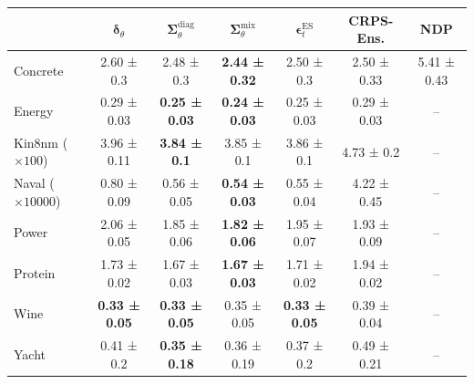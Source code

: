 \begin{tabular}{l|c|c|c|c|c|c}
\toprule
 & $\bm\delta_\theta$ & $\bm\Sigma_\theta^{\mathrm{diag}}$ & $\bm\Sigma_\theta^{\mathrm{mix}}$ & $\bm\epsilon_t^\mathrm{ES}$ & CRPS-Ens. & NDP \\
\midrule
Concrete & 2.60 ± 0.3 & 2.48 ± 0.3 & \textbf{2.44 ± 0.32} & 2.50 ± 0.3 & 2.50 ± 0.33 & 5.41 ± 0.43 \\
Energy & 0.29 ± 0.03 & \textbf{0.25 ± 0.03} & \textbf{0.24 ± 0.03} & 0.25 ± 0.03 & 0.29 ± 0.03 & -- \\
Kin8nm ($\times 100$) & 3.96 ± 0.11 & \textbf{3.84 ± 0.1} & 3.85 ± 0.1 & 3.86 ± 0.1 & 4.73 ± 0.2 & -- \\
Naval ($\times 10000$) & 0.80 ± 0.09 & 0.56 ± 0.05 & \textbf{0.54 ± 0.03} & 0.55 ± 0.04 & 4.22 ± 0.45 & -- \\
Power & 2.06 ± 0.05 & 1.85 ± 0.06 & \textbf{1.82 ± 0.06} & 1.95 ± 0.07 & 1.93 ± 0.09 & -- \\
Protein & 1.73 ± 0.02 & 1.67 ± 0.03 & \textbf{1.67 ± 0.03} & 1.71 ± 0.02 & 1.94 ± 0.02 & -- \\
Wine & \textbf{0.33 ± 0.05} & \textbf{0.33 ± 0.05} & 0.35 ± 0.05 & \textbf{0.33 ± 0.05} & 0.39 ± 0.04 & -- \\
Yacht & 0.41 ± 0.2 & \textbf{0.35 ± 0.18} & 0.36 ± 0.19 & 0.37 ± 0.2 & 0.49 ± 0.21 & -- \\
\bottomrule
\end{tabular}
